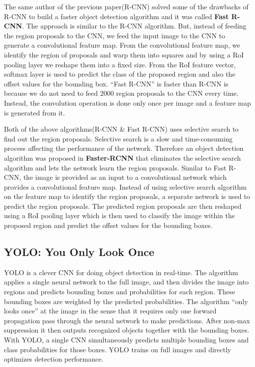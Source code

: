 The same author of the previous paper(R-CNN) solved some of the drawbacks of R-CNN to build a faster object detection algorithm and it was called \textbf{Fast R-CNN}. The approach is similar to the R-CNN algorithm. But, instead of feeding the region proposals to the CNN, we feed the input image to the CNN to generate a convolutional feature map. From the convolutional feature map, we identify the region of proposals and warp them into squares and by using a RoI pooling layer we reshape them into a fixed size. From the RoI feature vector, softmax layer is used to predict the class of the proposed region and also the offset values for the bounding box. “Fast R-CNN” is faster than R-CNN is because we do not need to feed 2000 region proposals to the CNN every time. Instead, the convolution operation is done only once per image and a feature map is generated from it.

Both of the above algorithms(R-CNN \& Fast R-CNN) uses selective search to find out the region proposals. Selective search is a slow and time-consuming process affecting the performance of the network. Therefore an object detection algorithm was proposed in \textbf{Faster-RCNN} that eliminates the selective search algorithm and lets the network learn the region proposals. Similar to Fast R-CNN, the image is provided as an input to a convolutional network which provides a convolutional feature map. Instead of using selective search algorithm on the feature map to identify the region proposals, a separate network is used to predict the region proposals. The predicted region proposals are then reshaped using a RoI pooling layer which is then used to classify the image within the proposed region and predict the offset values for the bounding boxes.

\subsection{YOLO: You Only Look Once}
YOLO is a clever CNN for doing object detection in real-time. The algorithm applies a single neural network to the full image, and then divides the image into regions and predicts bounding boxes and probabilities for each region. These bounding boxes are weighted by the predicted probabilities. The algorithm “only looks once” at the image in the sense that it requires only one forward propagation pass through the neural network to make predictions. After non-max suppression it then outputs recognized objects together with the bounding boxes. With YOLO, a single CNN simultaneously predicts multiple bounding boxes and class probabilities for those boxes. YOLO trains on full images and directly optimizes detection performance. 

